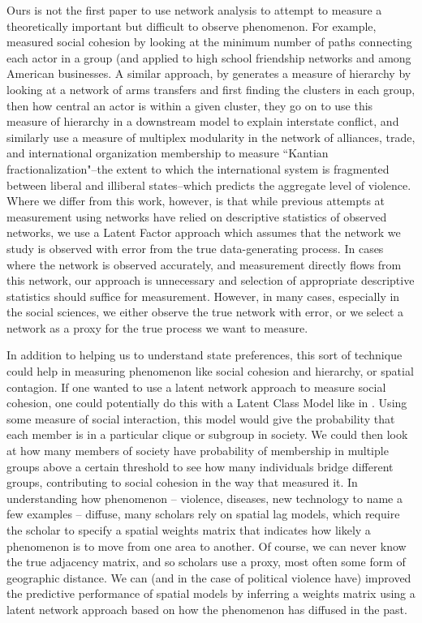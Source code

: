 Ours is not the first paper to use network analysis to attempt to measure a theoretically important but difficult to observe phenomenon. For example, \citet{moody:white:2003} measured social cohesion by looking at the minimum number of paths connecting each actor in a group (and applied to high school friendship networks and among American businesses. A similar approach, by \citet{beardsley:etal:2018} generates a measure of hierarchy by looking at a network of arms transfers and first finding the clusters in each group,  then how central an actor is within a given cluster, they go on to use this measure of hierarchy in a downstream model to explain interstate conflict, and similarly \citet{cranmer:etal:2015} use a measure of multiplex modularity in the network of alliances, trade, and international organization membership to measure ``Kantian fractionalization"--the extent to which the international system is fragmented between liberal and illiberal states--which predicts the aggregate level of violence. Where we differ from this work, however, is that while previous attempts at measurement using networks have relied on descriptive statistics of observed networks, we use a Latent Factor approach which assumes that the network we study is observed with error from the true data-generating process.  In cases where the network is observed accurately, and measurement directly flows from this network, our approach is unnecessary and selection of appropriate descriptive statistics should suffice for measurement. However, in many cases, especially in the social sciences, we either observe the true network with error, or we select a network as a proxy for the true process we want to measure. 

In addition to helping us to understand state preferences, this sort of technique could help in measuring phenomenon like social cohesion and hierarchy, or spatial contagion. If one wanted to use a latent network approach to measure social cohesion, one could potentially do this with a Latent Class Model like in \citet{airoldi:etal:2006}. Using some measure of social interaction, this model would give the probability that each member is in a particular clique or subgroup in society. We could then look at how many members of society have probability of membership in multiple groups above a certain threshold to see how many individuals bridge different groups, contributing to social cohesion in the way that \citet{moody:white:2003} measured it. In understanding how phenomenon -- violence, diseases, new technology to name a few examples -- diffuse, many scholars rely on spatial lag models, which require the scholar to specify a spatial weights matrix that indicates how likely a phenomenon is to move from one area to another. Of course, we can never know the true adjacency matrix, and so scholars use a proxy, most often some form of geographic distance. We can (and in the case of political violence have) improved the predictive performance of spatial models by inferring a weights matrix using a latent network approach based on how the phenomenon has diffused in the past. 


